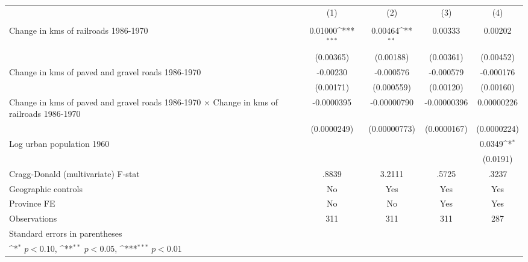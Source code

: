 {
\def\sym#1{\ifmmode^{#1}\else\(^{#1}\)\fi}
\begin{tabular}{l*{4}{c}}
\hline\hline
                &\multicolumn{1}{c}{(1)}&\multicolumn{1}{c}{(2)}&\multicolumn{1}{c}{(3)}&\multicolumn{1}{c}{(4)}\\
                &\multicolumn{1}{c}{}&\multicolumn{1}{c}{}&\multicolumn{1}{c}{}&\multicolumn{1}{c}{}\\
\hline
Change in kms of railroads 1986-1970&  0.01000\sym{***}&  0.00464\sym{**} &  0.00333         &  0.00202         \\
                &(0.00365)         &(0.00188)         &(0.00361)         &(0.00452)         \\
[1em]
Change in kms of paved and gravel roads 1986-1970& -0.00230         &-0.000576         &-0.000579         &-0.000176         \\
                &(0.00171)         &(0.000559)         &(0.00120)         &(0.00160)         \\
[1em]
Change in kms of paved and gravel roads 1986-1970 $\times$ Change in kms of railroads 1986-1970&-0.0000395         &-0.00000790         &-0.00000396         &0.00000226         \\
                &(0.0000249)         &(0.00000773)         &(0.0000167)         &(0.0000224)         \\
[1em]
Log urban population 1960&                  &                  &                  &   0.0349\sym{*}  \\
                &                  &                  &                  & (0.0191)         \\
\hline
Cragg-Donald (multivariate) F-stat&    .8839         &   3.2111         &    .5725         &    .3237         \\
Geographic controls&       No         &      Yes         &      Yes         &      Yes         \\
Province FE     &       No         &       No         &      Yes         &      Yes         \\
Observations    &      311         &      311         &      311         &      287         \\
\hline\hline
\multicolumn{5}{l}{\footnotesize Standard errors in parentheses}\\
\multicolumn{5}{l}{\footnotesize \sym{*} \(p<0.10\), \sym{**} \(p<0.05\), \sym{***} \(p<0.01\)}\\
\end{tabular}
}
